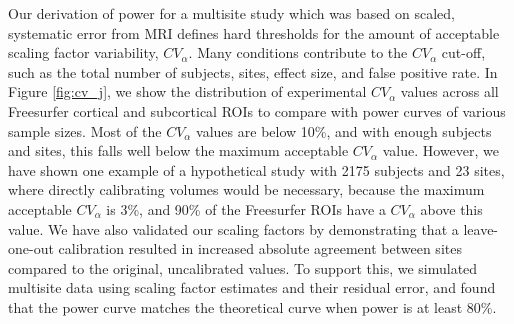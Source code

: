 Our derivation of power for a multisite study which was based on scaled, systematic error from MRI defines hard thresholds for the amount of acceptable scaling factor variability, $CV_{\alpha}$. Many conditions contribute to the $CV_{\alpha}$ cut-off, such as the total number of subjects, sites, effect size, and false positive rate. In Figure \ref{fig:cv_j}, we show the distribution of experimental $CV_{\alpha}$ values across all Freesurfer cortical and subcortical ROIs to compare with power curves of various sample sizes. Most of the $CV_{\alpha}$ values are below 10\%, and with enough subjects and sites, this falls well below the maximum acceptable $CV_{\alpha}$ value. However, we have shown one example of a hypothetical study with 2175 subjects and 23 sites, where directly calibrating volumes would be necessary, because the maximum acceptable $CV_{\alpha}$ is 3\%, and 90\% of the Freesurfer ROIs have a $CV_{\alpha}$ above this value. We have also validated our scaling factors by demonstrating that a leave-one-out calibration resulted in increased absolute agreement between sites compared to the original, uncalibrated values. To support this, we simulated multisite data using scaling factor estimates and their residual error, and found that the power curve matches the theoretical curve when power is at least 80\%.